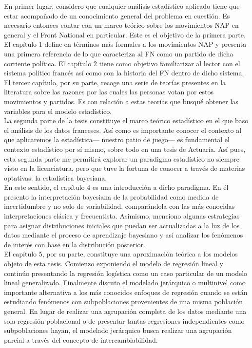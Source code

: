 En primer lugar, considero que cualquier análisis estadístico aplicado tiene que estar acompañado de un conocimiento general del problema en cuestión. Es necesario entonces contar con un marco teórico sobre los movimientos NAP en general y el Front National en particular. Este es el objetivo de la primera parte. El capítulo 1 define en términos más formales a los movimientos NAP y presenta una primera referencia de lo que caracteriza al FN como un partido de dicha corriente política. El capítulo 2 tiene como objetivo familiarizar al lector con el sistema político francés así como con la historia del FN dentro de dicho sistema. El tercer capítulo, por su parte, recoge una serie de teorías presentes en la literatura sobre las razones por las cuales las personas votan por estos movimientos y partidos. Es con relación a estas teorías que busqué obtener las variables para el modelo estadístico.\\

La segunda parte de la tesis constituye el marco teórico estadístico en el que baso el análisis de los datos franceses. Así como es importante conocer el contexto al que aplicaremos la estadística--- nuestro patio de juego--- es fundamental el contexto estadístico por sí mismo, sobre todo en una tesis de Actuaría. Así pues, esta segunda parte me permitirá explorar un paradigma estadístico no siempre visto en la licenciatura, pero que tuve la fortuna de conocer a través de materias optativas: la estadística bayesiana.\\ 

En este sentido, el capítulo 4 es una introducción a dicho paradigma. En él presento la interpretación bayesiana de la probabilidad como medida de incertidumbre y no solo de variabilidad, comparándola con las más conocidas interpretaciones clásica y frecuentista. Asimismo, menciono algunas estrategias para asignar distribuciones iniciales que puedan ser actualizadas a la luz de los datos mediante el proceso de aprendizaje bayesiano y así analizar los fenómenos de interés con base en la distribución posterior.\\ 

El capítulo 5, por su parte, constituye una aproximación teórica a los modelos objeto de esta tesis. Comienzo exponiendo el modelo de regresión lineal y continúo presentando la regresión logística como un caso particular de un modelo lineal generalizado. Finalmente discuto el modelado jerárquico o multinivel como importante alternativa a los más conocidos enfoques de regresión cuando se están estudiando fenómenos con subpoblaciones provenientes de una misma población general. En lugar de realizar una agrupación completa de los datos mediante una sola regresión poblacional o de presentar tantas regresiones independientes como subpoblaciones hayan, el modelado jerárquico busca realizar una agrupación parcial a través del concepto de intercambiabilidad.\\

